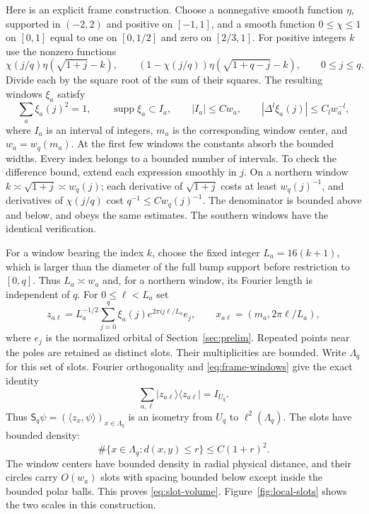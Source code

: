 Here is an explicit frame construction.  Choose a nonnegative smooth
function $\eta$, supported in $(-2,2)$ and positive on $[-1,1]$, and a
smooth function $0\leq\chi\leq1$ on $[0,1]$ equal to one on $[0,1/2]$ and zero on
$[2/3,1]$.  For positive integers $k$ use the nonzero functions
\[
 \chi(j/q)\eta(\sqrt{1+j}-k),\qquad
 (1-\chi(j/q))\eta(\sqrt{1+q-j}-k),\qquad 0\leq j\leq q.
\]
Divide each by the square root of the sum of their squares.  The resulting
windows $\xi_a$ satisfy
\begin{equation}
 \sum_a\xi_a(j)^2=1,\qquad
\operatorname{supp}\xi_a\subset I_a,\qquad
 |I_a|\leq Cw_a,\qquad
 |\Delta^l\xi_a(j)|\leq C_lw_a^{-l},
 \label{eq:frame-windows}
\end{equation}
where $I_a$ is an interval of integers, $m_a$ is the corresponding window
center, and $w_a=w_q(m_a)$.  At the first few windows the constants absorb
the bounded widths.  Every index belongs to a bounded number of intervals.
To check the difference bound, extend each expression smoothly in $j$.
On a northern window $k\asymp\sqrt{1+j}\asymp w_q(j)$; each derivative
of $\sqrt{1+j}$ costs at least $w_q(j)^{-1}$, and derivatives of
$\chi(j/q)$ cost $q^{-1}\leq Cw_q(j)^{-1}$.  The denominator is bounded
above and below, and obeys the same estimates.  The southern windows have
the identical verification.

For a window bearing the index $k$, choose the fixed integer
$L_a=16(k+1)$, which is larger than the diameter of the full bump support
before restriction to $[0,q]$.  Thus $L_a\asymp w_a$ and, for a
northern window, its Fourier length is independent of $q$.
For $0\leq\ell<L_a$ set
\begin{equation}
 z_{a\ell}=L_a^{-1/2}\sum_{j=0}^q
       \xi_a(j)e^{2\pi i j\ell/L_a}e_j,
 \qquad x_{a\ell}=(m_a,2\pi\ell/L_a),
 \label{eq:frame-atoms}
\end{equation}
where $e_j$ is the normalized orbital of Section~\ref{sec:prelim}.
Repeated points near the poles are retained as distinct slots.  Their
multiplicities are bounded.  Write $\Lambda_q$ for this set of slots.
Fourier orthogonality and \eqref{eq:frame-windows} give the exact identity
\begin{equation}
 \sum_{a,\ell}|z_{a\ell}\rangle\langle z_{a\ell}|=I_{U_q}.
 \label{eq:tight-frame}
\end{equation}
Thus $\mathsf S_q\psi=(\langle z_x,\psi\rangle)_{x\in\Lambda_q}$ is an isometry
from $U_q$ to $\ell^2(\Lambda_q)$.  The slots have bounded density:
\begin{equation}
 \#\{x\in\Lambda_q:d(x,y)\leq r\}\leq C(1+r)^2.
 \label{eq:slot-volume}
\end{equation}
The window centers have bounded density in radial physical distance,
and their circles carry $O(w_a)$ slots with spacing bounded below except
inside the bounded polar balls.  This proves \eqref{eq:slot-volume}.
Figure~\ref{fig:local-slots} shows the two scales in this construction.

